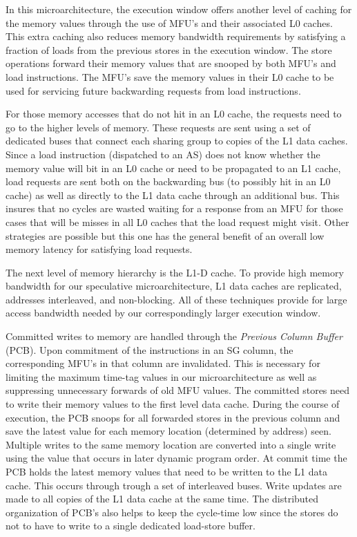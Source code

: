 \documentclass[10pt,twocolumn]{IEEEtran}
\begin{document}
In this microarchitecture, the execution window offers another level of
caching for the memory values through the use of MFU's and
their associated L0 caches.  This extra caching also
reduces memory bandwidth requirements by satisfying
a fraction of loads from the previous stores in the execution window.
The store operations forward
their memory values that are snooped by both MFU's and load instructions.
The MFU's save the memory values in their L0 cache to be used for
servicing future backwarding requests from load instructions.

For those memory accesses that do not hit in an L0 cache, the requests
need to go to the higher levels of memory.  These requests 
are sent using a set of dedicated buses that connect each
sharing group to copies of the L1 data caches.  Since a load instruction
(dispatched to an AS) does not know
whether the memory value will bit in an L0 cache or need to be propagated to
an L1 cache, 
load requests are sent both on the backwarding bus (to possibly hit
in an L0 cache)
as well as directly to the L1 data cache through an additional bus.
This insures that no cycles
are wasted waiting for a response from an MFU for those cases 
that will be misses in all L0 caches that the load request might visit.
Other strategies are possible but this one has the general benefit of 
an overall low memory latency for satisfying load requests.

The next level of memory hierarchy is the L1-D cache.
To provide high memory bandwidth for our speculative microarchitecture,
L1 data caches are replicated, addresses
interleaved, and non-blocking.
All of these techniques provide for large access bandwidth
needed by our correspondingly larger execution window.

Committed writes to memory are handled through the
\emph{Previous Column Buffer} (PCB).
Upon commitment of the instructions in an SG column, 
the corresponding MFU's in that column are invalidated.  
This is necessary for limiting the maximum time-tag values
in our microarchitecture as well as suppressing unnecessary forwards of old
MFU values.  
The committed stores need to write their memory values to the
f{ir}st level data cache.  
During the course of execution, the PCB snoops
for all forwarded stores in the previous column and save the latest value
for each memory location (determined by address) seen.  
Multiple writes to the same
memory location are converted into a single write using the value
that occurs in later dynamic program order.
At commit time the PCB holds the latest memory values that need
to be
written to the L1 data cache.  This occurs through trough a set of 
interleaved buses.
Write updates are made to all copies of the L1 data cache at the same time.
The distributed organization of PCB's also helps to keep the cycle-time 
low since the stores do not to have 
to write to a single dedicated load-store buffer.
%
%
\end{document}
